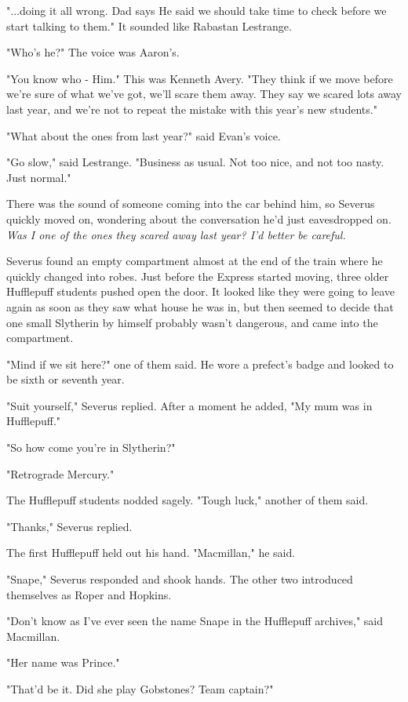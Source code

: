 \documentclass[a4paper,11pt]{article}
\begin{document}
"...doing it all wrong. Dad says He said we should take time to check before we start talking to them." It sounded like Rabastan Lestrange.

"Who's he?" The voice was Aaron's.

"You know who - Him." This was Kenneth Avery. "They think if we move before we're sure of what we've got, we'll scare them away. They say we scared lots away last year, and we're not to repeat the mistake with this year's new students."

"What about the ones from last year?" said Evan's voice.

"Go slow," said Lestrange. "Business as usual. Not too nice, and not too nasty. Just normal."

There was the sound of someone coming into the car behind him, so Severus quickly moved on, wondering about the conversation he'd just eavesdropped on. \emph{Was I one of the ones they scared away last year? I'd better be careful.}

Severus found an empty compartment almost at the end of the train where he quickly changed into robes. Just before the Express started moving, three older Hufflepuff students pushed open the door. It looked like they were going to leave again as soon as they saw what house he was in, but then seemed to decide that one small Slytherin by himself probably wasn't dangerous, and came into the compartment.

"Mind if we sit here?" one of them said. He wore a prefect's badge and looked to be sixth or seventh year.

"Suit yourself," Severus replied. After a moment he added, "My mum was in Hufflepuff."

"So how come you're in Slytherin?"

"Retrograde Mercury."

The Hufflepuff students nodded sagely. "Tough luck," another of them said.

"Thanks," Severus replied.

The first Hufflepuff held out his hand. "Macmillan," he said.

"Snape," Severus responded and shook hands. The other two introduced themselves as Roper and Hopkins.

"Don't know as I've ever seen the name Snape in the Hufflepuff archives," said Macmillan.

"Her name was Prince."

"That'd be it. Did she play Gobstones? Team captain?"
\end{document}
